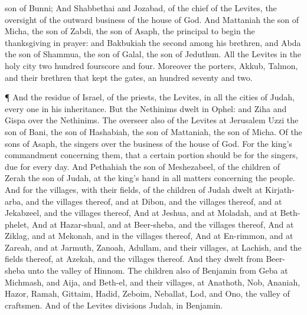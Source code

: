 {son of
Bunni;
And
Shabbethai and
Jozabad, of the
chief of the
Levites,
{} the oversight of the
outward
business of the
house of
God.
And
Mattaniah the
son of
Micha, the
son of
Zabdi, the
son of
Asaph,
{} the
principal to
begin the
thanksgiving in
prayer: and
Bakbukiah the
second among his
brethren, and
Abda the
son of
Shammua, the
son of
Galal, the
son of
Jeduthun.
All the
Levites in the
holy
city
{} two
hundred
fourscore and
four.
Moreover the
porters,
Akkub,
Talmon, and their
brethren that
kept the
gates,
{} an
hundred
seventy and
two.
\par }{\PP {}¶ And the
residue of
Israel, of the
priests,
{} the
Levites,
{} in all the
cities of
Judah, every
one in his
inheritance.
But the
Nethinims
dwelt in
Ophel: and
Ziha and
Gispa
{} over the
Nethinims.
The
overseer also of the
Levites at
Jerusalem
{}
Uzzi the
son of
Bani, the
son of
Hashabiah, the
son of
Mattaniah, the
son of
Micha. Of the
sons of
Asaph, the
singers
{}
over the
business of the
house of
God.
For
{} the
king’s
commandment concerning them, that a certain
portion should be for the
singers,
due for every
day.
And
Pethahiah the
son of
Meshezabeel, of the
children of
Zerah the
son of
Judah,
{} at the
king’s
hand in all
matters concerning the
people.
And for the
villages, with their
fields,
{} of the
children of
Judah
dwelt at
Kirjath-arba, and
{} the
villages thereof, and at
Dibon, and
{} the
villages thereof, and at
Jekabzeel, and
{} the
villages thereof,
And at
Jeshua, and at
Moladah, and at
Beth-phelet,
And at
Hazar-shual, and at
Beer-sheba, and
{} the
villages thereof,
And at
Ziklag, and at
Mekonah, and in the
villages thereof,
And at
En-rimmon, and at
Zareah, and at
Jarmuth,
Zanoah,
Adullam, and
{} their
villages, at
Lachish, and the
fields thereof, at
Azekah, and
{} the
villages thereof. And they
dwelt from
Beer-sheba unto the
valley of
Hinnom.
The
children also of
Benjamin from
Geba
{} at
Michmash, and
Aija, and
Beth-el, and
{} their
villages,
 at
Anathoth,
Nob,
Ananiah,
Hazor,
Ramah,
Gittaim,
Hadid,
Zeboim,
Neballat,
Lod, and
Ono, the
valley of
craftsmen.
And of the
Levites
{}
divisions
{}
Judah,
{} in
Benjamin.

}
